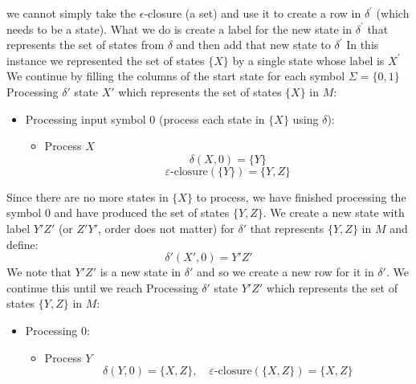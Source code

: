 \documentclass{report}
\begin{document}
\begin{itemize}
            \bigbreak \noindent 
            we cannot simply take the $\epsilon$-closure (a set) and use it to create a row in $\delta^{\prime}$ (which needs to be a state). What we do is create a label for the new state in $\delta^{\prime}$ that represents the set of states from $\delta$ and then add that new state to $\delta^{\prime}$
            \bigbreak \noindent 
            In this instance we represented the set of states $\{X\}$ by a single state whose label is $X^{\prime}$
            \bigbreak \noindent 
            We continue by filling the columns of the start state for each symbol $\Sigma = \{0, 1\}$
            \bigbreak \noindent 
            Processing $\delta'$ state $X'$ which represents the set of states $\{X\}$ in $M$:
            \begin{itemize}
                \item Processing input symbol 0 (process each state in $\{X\}$ using $\delta$):
                    \begin{itemize}
                        \item Process $X$
                            \[
                                \delta(X, 0) = \{Y\}
                            \]
                            \[
                                \varepsilon\text{-closure}(\{Y\}) = \{Y, Z\}
                            \]
                    \end{itemize}
            \end{itemize}
    Since there are no more states in $\{X\}$ to process, we have finished processing the symbol 0 and have produced the set of states $\{Y, Z\}$.
    \bigbreak \noindent 
    We create a new state with label $Y'Z'$ (or $Z'Y'$, order does not matter) for $\delta'$ that represents $\{Y, Z\}$ in $M$ and define:
    \[
    \delta'(X', 0) = Y'Z'
    \]
    We note that $Y'Z'$ is a new state in $\delta'$ and so we create a new row for it in $\delta'$.
    \bigbreak \noindent 
    We continue this until we reach 
    \bigbreak \noindent 
    \bigbreak \noindent 
    Processing $\delta'$ state $Y'Z'$ which represents the set of states $\{Y, Z\}$ in $M$:
    \begin{itemize}
        \item Processing 0:
            \begin{itemize}
                \item Process $Y$
                    \[
                        \delta(Y, 0) = \{X, Z\}, \quad \varepsilon\text{-closure}(\{X, Z\}) = \{X, Z\}
                    \]

\end{itemize}
\end{itemize}
\end{itemize}
\end{document}
